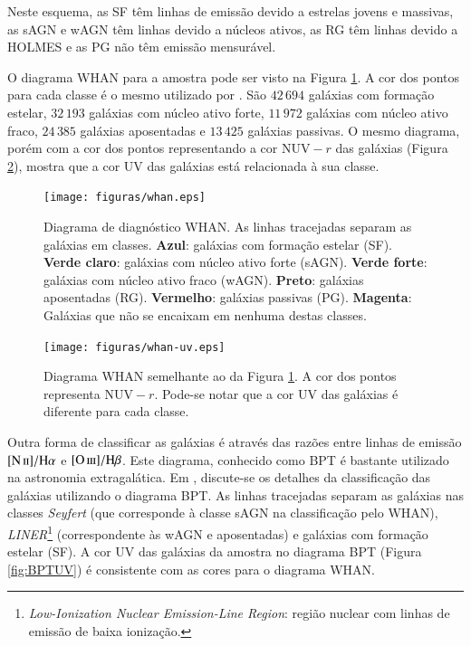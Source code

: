 Neste esquema, as SF têm linhas de emissão devido a estrelas jovens e massivas,
as sAGN e wAGN têm linhas devido a núcleos ativos, as RG têm linhas devido a
HOLMES e as PG não têm emissão mensurável.

O diagrama WHAN para a amostra \starlightUV pode ser visto na Figura
\ref{fig:Whan}. A cor dos pontos para cada classe é o mesmo utilizado por
\citet{CidFernandes2011}. São $42\,694$ galáxias com formação estelar, $32\,193$
galáxias com núcleo ativo forte, $11\,972$ galáxias com núcleo ativo fraco,
$24\,385$ galáxias aposentadas e $13\,425$ galáxias passivas. O mesmo diagrama,
porém com a cor dos pontos representando a cor $\mathrm{NUV}-r$ das galáxias
(Figura \ref{fig:WhanUV}), mostra que a cor UV das galáxias está relacionada à
sua classe.

\begin{figure}
	\texttt{[image: figuras/whan.eps]}
	\caption[Diagrama de diagnóstico WHAN.]
	{Diagrama de diagnóstico WHAN. As linhas tracejadas separam as galáxias
	em classes. \textbf{Azul}: galáxias com formação estelar (SF). \textbf{Verde
	claro}: galáxias com núcleo ativo forte (sAGN). \textbf{Verde forte}:
	galáxias com núcleo ativo fraco (wAGN). \textbf{Preto}: galáxias aposentadas
	(RG). \textbf{Vermelho}: galáxias passivas (PG). \textbf{Magenta}: Galáxias
	que não se encaixam em nenhuma destas classes.}
	\label{fig:Whan}
\end{figure}

\begin{figure}
	\texttt{[image: figuras/whan-uv.eps]}
	\caption[Cores UV no diagrama WHAN.]
	{Diagrama WHAN semelhante ao da Figura \ref{fig:Whan}. A cor dos pontos
	representa $\mathrm{NUV}-r$. Pode-se notar que a cor UV das galáxias é
	diferente para cada classe.}
	\label{fig:WhanUV}
\end{figure}

Outra forma de classificar as galáxias é através das razões entre linhas de
emissão $\nII/\Halpha$ e $\oIII/\Hbeta$. Este diagrama, conhecido como BPT
\citep*{Baldwin1981} é bastante utilizado na astronomia extragalática. Em
\citet{CidFernandes2010}, discute-se os detalhes da classificação das galáxias
utilizando o diagrama BPT. As linhas tracejadas separam as galáxias nas classes
{\em Seyfert} (que corresponde à classe sAGN na classificação pelo WHAN), {\em
LINER}\footnote{{\em Low-Ionization Nuclear Emission-Line Region}: região
nuclear com linhas de emissão de baixa ionização.} (correspondente às wAGN e
aposentadas) e galáxias com formação estelar (SF). A cor UV das galáxias da
amostra no diagrama BPT (Figura \ref{fig:BPTUV}) é consistente com as cores para
o diagrama WHAN.

